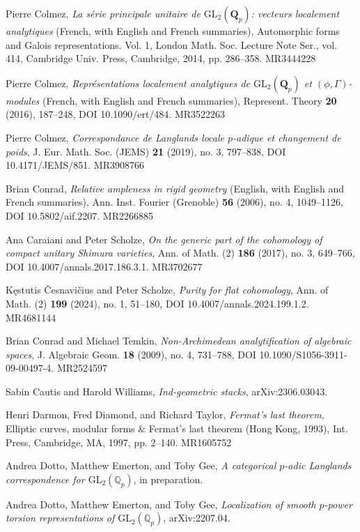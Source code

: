 \item[{[Col14]}] Pierre Colmez, \emph{La s\'erie principale unitaire de $\mathrm{GL}_2(\mathbf{Q}_p)$: vecteurs localement analytiques} (French, with English and French summaries), Automorphic forms and Galois representations. Vol. 1, London Math. Soc. Lecture Note Ser., vol. 414, Cambridge Univ. Press, Cambridge, 2014, pp. 286--358. MR3444228
\item[{[Col16]}] Pierre Colmez, \emph{Repr\'esentations localement analytiques de $\mathrm{GL}_2(\mathbf{Q}_p)$ et $(\phi,\Gamma)$-modules} (French, with English and French summaries), Represent. Theory \textbf{20} (2016), 187--248, DOI 10.1090/ert/484. MR3522263
\item[{[Col19]}] Pierre Colmez, \emph{Correspondance de Langlands locale $p$-adique et changement de poids}, J. Eur. Math. Soc. (JEMS) \textbf{21} (2019), no. 3, 797--838, DOI 10.4171/JEMS/851. MR3908766
\item[{[Con06]}] Brian Conrad, \emph{Relative ampleness in rigid geometry} (English, with English and French summaries), Ann. Inst. Fourier (Grenoble) \textbf{56} (2006), no. 4, 1049--1126, DOI 10.5802/aif.2207. MR2266885
\item[{[CS17]}] Ana Caraiani and Peter Scholze, \emph{On the generic part of the cohomology of compact unitary Shimura varieties}, Ann. of Math. (2) \textbf{186} (2017), no. 3, 649--766, DOI 10.4007/annals.2017.186.3.1. MR3702677
\item[{[{\v{C}S24}]}] K\k{e}stutis \v{C}esnavi\v{c}ius and Peter Scholze, \emph{Purity for flat cohomology}, Ann. of Math. (2) \textbf{199} (2024), no. 1, 51--180, DOI 10.4007/annals.2024.199.1.2. MR4681144
\item[{[CT09]}] Brian Conrad and Michael Temkin, \emph{Non-Archimedean analytification of algebraic spaces}, J. Algebraic Geom. \textbf{18} (2009), no. 4, 731--788, DOI 10.1090/S1056-3911-09-00497-4. MR2524597
\item[{[CW24]}] Sabin Cautis and Harold Williams, \emph{Ind-geometric stacks}, arXiv:2306.03043.
\item[{[DDT97]}] Henri Darmon, Fred Diamond, and Richard Taylor, \emph{Fermat's last theorem}, Elliptic curves, modular forms \& Fermat's last theorem (Hong Kong, 1993), Int. Press, Cambridge, MA, 1997, pp. 2--140. MR1605752
\item[{[DEG]}] Andrea Dotto, Matthew Emerton, and Toby Gee, \emph{A categorical $p$-adic Langlands correspondence for $\mathrm{GL}_2(\mathbb{Q}_p)$}, in preparation.
\item[{[DEG23]}] Andrea Dotto, Matthew Emerton, and Toby Gee, \emph{Localization of smooth $p$-power torsion representations of $\mathrm{GL}_2(\mathbb{Q}_p)$}, arXiv:2207.04.
